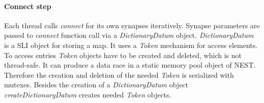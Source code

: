 \paragraph{Connect step}
Each thread calls \emph{connect} for its own synapses iteratively.
Synapse parameters are passed to \emph{connect} function call via a \emph{DictionaryDatum} object.
\emph{DictionaryDatum} is a SLI object for storing a map.
It uses a \emph{Token} mechanism for access elements.
To access entries \emph{Token} objects have to be created and deleted,
which is not thread-safe. It can produce a data race in a static memory pool object of NEST.
Therefore the creation and deletion of the needed \emph{Token} is serialized with mutexes.
Besides the creation of a \emph{DictionaryDatum} object \emph{createDictionaryDatum} creates needed \emph{Token} objects.

